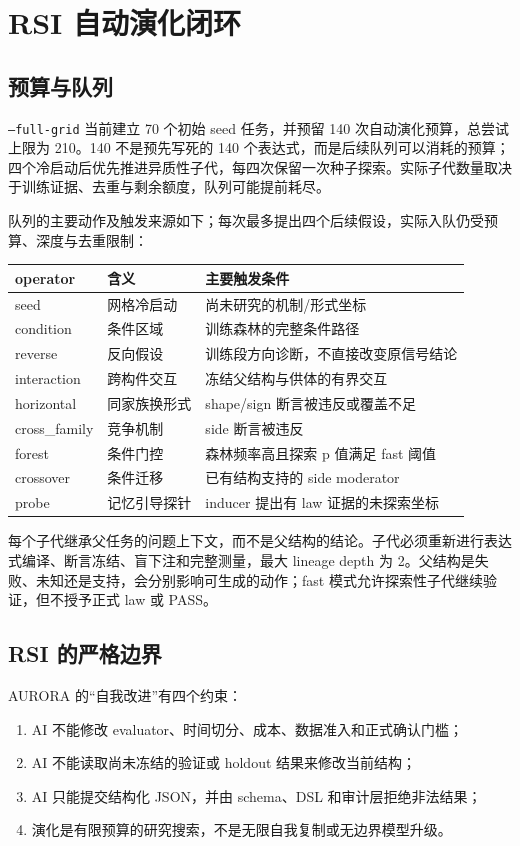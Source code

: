 \documentclass[11pt,a4paper]{article}
\newcommand{\code}[1]{\texttt{#1}}
\begin{document}
\section{RSI 自动演化闭环}
\subsection{预算与队列}
\code{--full-grid} 当前建立 70 个初始 seed 任务，并预留 140 次自动演化预算，总尝试上限为 210。140 不是预先写死的 140 个表达式，而是后续队列可以消耗的预算；四个冷启动后优先推进异质性子代，每四次保留一次种子探索。实际子代数量取决于训练证据、去重与剩余额度，队列可能提前耗尽。

队列的主要动作及触发来源如下；每次最多提出四个后续假设，实际入队仍受预算、深度与去重限制：
\begin{center}
\begin{tabular}{lll}
\toprule
operator & 含义 & 主要触发条件 \\
\midrule
seed & 网格冷启动 & 尚未研究的机制/形式坐标 \\
condition & 条件区域 & 训练森林的完整条件路径 \\
reverse & 反向假设 & 训练段方向诊断，不直接改变原信号结论 \\
interaction & 跨构件交互 & 冻结父结构与供体的有界交互 \\
horizontal & 同家族换形式 & shape/sign 断言被违反或覆盖不足 \\
cross\_family & 竞争机制 & side 断言被违反 \\
forest & 条件门控 & 森林频率高且探索 p 值满足 fast 阈值 \\
crossover & 条件迁移 & 已有结构支持的 side moderator \\
probe & 记忆引导探针 & inducer 提出有 law 证据的未探索坐标 \\
\bottomrule
\end{tabular}
\end{center}

每个子代继承父任务的问题上下文，而不是父结构的结论。子代必须重新进行表达式编译、断言冻结、盲下注和完整测量，最大 lineage depth 为 2。父结构是失败、未知还是支持，会分别影响可生成的动作；fast 模式允许探索性子代继续验证，但不授予正式 law 或 PASS。



\subsection{RSI 的严格边界}
AURORA 的“自我改进”有四个约束：
\begin{enumerate}[leftmargin=2em]
  \item AI 不能修改 evaluator、时间切分、成本、数据准入和正式确认门槛；
  \item AI 不能读取尚未冻结的验证或 holdout 结果来修改当前结构；
  \item AI 只能提交结构化 JSON，并由 schema、DSL 和审计层拒绝非法结果；
  \item 演化是有限预算的研究搜索，不是无限自我复制或无边界模型升级。
\end{enumerate}
\end{document}
